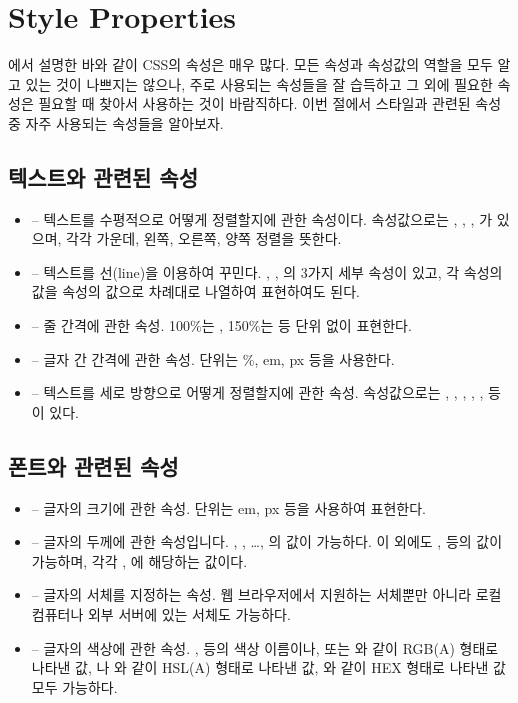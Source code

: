 \section{Style Properties} \label{sect:style-properties}

에서 설명한 바와 같이 CSS의 속성은 매우 많다. 모든 속성과 속성값의 역할을 모두 알고 있는 것이 나쁘지는 않으나, 주로 사용되는 속성들을 잘 습득하고 그 외에 필요한 속성은 필요할 때 찾아서 사용하는 것이 바람직하다. 이번 절에서 스타일과 관련된 속성 중 자주 사용되는 속성들을 알아보자.

\subsection*{텍스트와 관련된 속성}

\begin{itemize}
    \item {} – 텍스트를 수평적으로 어떻게 정렬할지에 관한 속성이다. 속성값으로는 , , , 가 있으며, 각각 가운데, 왼쪽, 오른쪽, 양쪽 정렬을 뜻한다.
    \item {} – 텍스트를 선(line)을 이용하여 꾸민다. , , 의 3가지 세부 속성이 있고, 각 속성의 값을  속성의 값으로 차례대로 나열하여 표현하여도 된다.	
    \item {} – 줄 간격에 관한 속성. 100\%는 , 150\%는  등 단위 없이 표현한다.
    \item {} – 글자 간 간격에 관한 속성. 단위는 \%, em, px 등을 사용한다.
    \item {} – 텍스트를 세로 방향으로 어떻게 정렬할지에 관한 속성. 속성값으로는 , , , , ,  등이 있다.
\end{itemize}

\subsection*{폰트와 관련된 속성}

\begin{itemize}
    \item {} – 글자의 크기에 관한 속성. 단위는 em, px 등을 사용하여 표현한다.
    \item {} – 글자의 두께에 관한 속성입니다. , , \ldots, 의 값이 가능하다. 이 외에도 ,  등의 값이 가능하며, 각각 , 에 해당하는 값이다.
    \item {} – 글자의 서체를 지정하는 속성. 웹 브라우저에서 지원하는 서체뿐만 아니라 로컬 컴퓨터나 외부 서버에 있는 서체도 가능하다.
    \item {} – 글자의 색상에 관한 속성. ,  등의 색상 이름이나,  또는 와 같이 RGB(A) 형태로 나타낸 값, 나 와 같이 HSL(A) 형태로 나타낸 값, 와 같이 HEX 형태로 나타낸 값 모두 가능하다.
\end{itemize}

